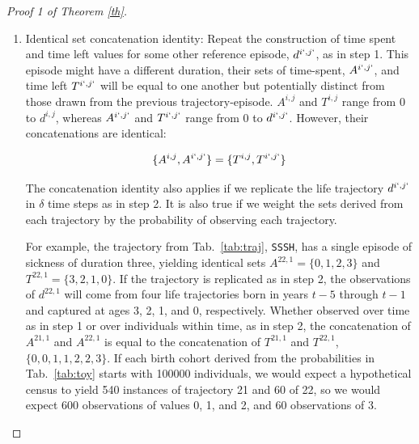 \documentclass[12pt,oneside,a4paper]{article}
\theoremstyle{definition}
\newcommand{\vb}[1]{\texttt{#1}}
\begin{document}
\begin{proof}[Proof 1 of Theorem \ref{th}]
\begin{enumerate}
Formally, sets $A^{i,j}$ and $T^{i,j}$ consist of the same values as the previous, but
coming from distinct instances of life trajectories generated in a uniform series from between $t-a_R^{i,j}$ years
ago until as recently as $t-a_L^{i,j}$ years ago. This demonstrates both
period-cohort set equality and time spent-left set equality. The blue and red triangles in
Figure~\ref{fig:clones} are simple rotations of one another.

Continuing with the episode $d^{21,1}$ in Tab.~\ref{tab:traj}, if we replicate this trajectory in single year steps, and take a census in year $t$, the values of $A^{21,1}$ and $T^{21,1}$ are the same as before $\{0,1,2\}$, but taken from three different life trajectories that began in years $t-4$, $t-3$, and $t-2$, and were observed at ages 3, 2, and 1, respectively.

\FloatBarrier
\item{Identical set concatenation identity:} Repeat the construction of time spent and time left values for some other reference episode, $d^{i`,j`}$, as in step 1. This episode might have a different duration, their
sets of time-spent, $A^{i`,j`}$, and time left $T^{i`,j`}$ will be equal to one another but potentially distinct from those drawn from the previous trajectory-episode. $A^{i,j}$ and $T^{i,j}$ range from 0 to $d^{i,j}$, whereas $A^{i`,j`}$ and $T^{i`,j`}$
range from 0 to $d^{i`,j`}$. However, their concatenations are identical:

\begin{equation}
\label{eq:unioneq}
\{A^{i,j} , A^{i`,j`}\} = \{T^{i,j} , T^{i`,j`}\}
\end{equation}

The concatenation identity also applies if we replicate the life trajectory $d^{i`,j`}$ in $\delta$ time steps as in step 2. It is also true if we weight the sets derived from each trajectory by the probability of observing each trajectory.

For example, the  trajectory from Tab.~\ref{tab:traj}, \vb{SSSH}, has a single episode of sickness of duration three, yielding identical sets $A^{22,1} = \{0,1,2,3 \}$ and $T^{22,1} = \{3,2,1,0 \}$. If the trajectory is replicated as in step 2, the observations of $d^{22,1}$ will come from four life trajectories born in years $t-5$ through $t-1$ and captured at ages 3, 2, 1, and 0, respectively. Whether observed over time as in step 1 or over individuals within time, as in step 2, the concatenation of $A^{21,1}$ and $A^{22,1}$ is equal to the concatenation of $T^{21,1}$ and $T^{22,1}$, $\{0,0,1,1,2,2,3 \}$. If each birth cohort derived from the probabilities in Tab.~\ref{tab:toy} starts with 100000 individuals, we would expect a hypothetical census to yield 540 instances of trajectory 21 and 60 of 22, so we would expect 600 observations of values 0, 1, and 2, and 60 observations of 3.


\end{enumerate}
\end{proof}
\end{document}

